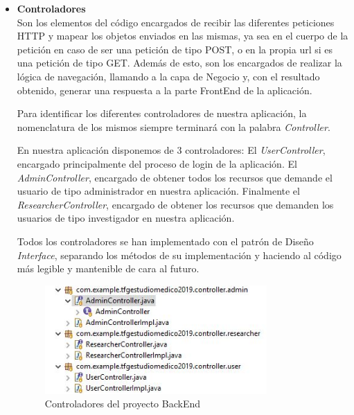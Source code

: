         \begin{itemize}
            \item\textbf{Controladores}  \\
            Son los elementos del código encargados de recibir las diferentes peticiones HTTP y mapear los objetos enviados en las mismas, ya sea en el cuerpo de la petición en caso de ser una petición de tipo POST, o en la propia url si es una petición de tipo GET. Además de esto, son los encargados de realizar la lógica de navegación, llamando a la capa de Negocio y, con el resultado obtenido, generar una respuesta a la parte FrontEnd de la aplicación.
            \newline
            
            Para identificar los diferentes controladores de nuestra aplicación, la nomenclatura de los mismos siempre terminará con la palabra \textit{Controller}.
            \newline
            
            En nuestra aplicación disponemos de 3 controladores: El \textit{UserController}, encargado principalmente del proceso de login de la aplicación. El \textit{AdminController}, encargado de obtener todos los recursos que demande el usuario de tipo administrador en nuestra aplicación. Finalmente el \textit{ResearcherController}, encargado de obtener los recursos que demanden los usuarios de tipo investigador en nuestra aplicación.
            \newline
            
            Todos los controladores se han implementado con el patrón de Diseño \textit{Interface}, separando los métodos de su implementación y haciendo al código más legible y mantenible de cara al futuro.
            \newline
            
                \begin{figure}[h]
                    \centering
                     \includegraphics[width=0.8\textwidth]{images/controllers.JPG}
                    \caption{Controladores del proyecto BackEnd}
                \end{figure}
                

\end{itemize}
